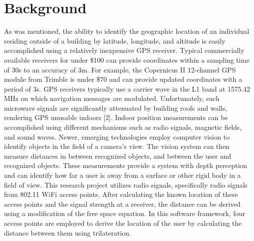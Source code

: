 \documentclass[conference]{IEEEtran}
\begin{document}
\section{Background}
\noindent As was mentioned, the ability to identify the geographic location of an individual residing outside of a building by latitude, longitude, and altitude is easily accomplished using a relatively inexpensive GPS receiver. Typical commercially available receivers for under \$100 can provide coordinates within a sampling time of 30s to an accuracy of \newcommand{\rpm}{\raisebox{.2ex}{$\scriptstyle\pm$}} 3m. For example, the Copernicus II 12-channel GPS module from Trimble is under \$70 and can provide updated coordinates with a period of 3s. GPS receivers typically use a carrier wave in the L1 band at 1575.42 MHz on which navigation messages are modulated. Unfortunately, such microwave signals are significantly attenuated by building roofs and walls, rendering GPS unusable indoors [2].
Indoor position measurements can be accomplished using different mechanisms such as radio signals, magnetic fields, and sound waves. Newer, emerging technologies employ computer vision to identify objects in the field of a camera's view. The vision system can then measure distances in between recognized objects, and between the user and recognized objects. These measurements provide a system with depth perception and can identify how far a user is away from a surface or other rigid body in a field of view.
This research project utilizes radio signals, specifically radio signals from 802.11 WiFi access points. After calculating the known location of these access points and the signal strength at a receiver, the distance can be derived using a modification of the free space equation. In this software framework, four access points are employed to derive the location of the user by calculating the distance between them using trilateration.
\end{document}
